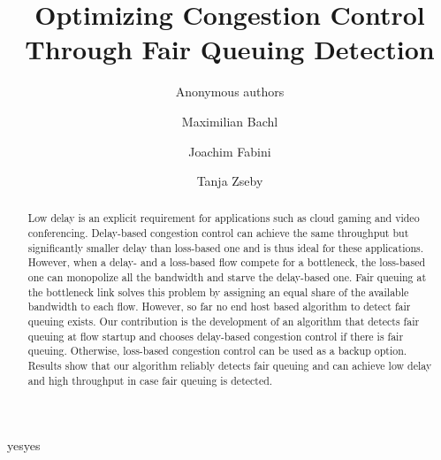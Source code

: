 \documentclass[runningheads]{llncs}
\def\anonymize{yes}
\def\tempYes{yes}
\begin{document}
%
\title{Optimizing Congestion Control Through Fair Queuing Detection}


%
\ifx\anonymize\tempYes
\author{Anonymous authors}
%
%
\else
\author{Maximilian Bachl \and
Joachim Fabini \and
Tanja Zseby}
%
%
\fi

\maketitle              %



\begin{abstract}
Low delay is an explicit requirement for applications such as cloud gaming and video conferencing. Delay-based congestion control can achieve the same throughput but significantly smaller delay than loss-based one and is thus ideal for these applications. However, when a delay- and a loss-based flow compete for a bottleneck, the loss-based one can monopolize all the bandwidth and starve the delay-based one. Fair queuing at the bottleneck link solves this problem by assigning an equal share of the available bandwidth to each flow. However, so far no end host based algorithm to detect fair queuing exists. Our contribution is the development of an algorithm that detects fair queuing at flow startup and chooses delay-based congestion control if there is fair queuing. Otherwise, loss-based congestion control can be used as a backup option. Results show that our algorithm reliably detects fair queuing and can achieve low delay and high throughput in case fair queuing is detected. 

\end{abstract}
%
%
%
\end{document}

